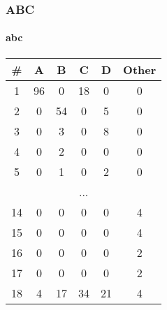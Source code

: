 \documentclass{beamer}
\begin{document}
\begin{frame}
    \frametitle{ABC}
    \framesubtitle{abc}
    
    \begin{table}
        \vspace{-0.1in}
        \centering
        \begin{tabular}{ | c | c | c | c | c | c | }
            \hline
            \# & A & B & C & D & Other \\ \hline
            1 & 96 & 0 & 18 & 0 & 0 \\ \hline
            2 & 0 & 54 & 0 & 5 & 0 \\ \hline
            3 & 0 & 3 & 0 & 8 & 0 \\ \hline
            4 & 0 & 2 & 0 & 0 & 0 \\ \hline
            5 & 0 & 1 & 0 & 2 & 0 \\ \hline
            \multicolumn{6}{c}{...} \\ \hline
            14 & 0 & 0 & 0 & 0 & 4 \\ \hline
            15 & 0 & 0 & 0 & 0 & 4 \\ \hline
            16 & 0 & 0 & 0 & 0 & 2 \\ \hline
            17 & 0 & 0 & 0 & 0 & 2 \\ \hline
            18 & 4 & 17 & 34 & 21 & 4 \\ \hline
        \end{tabular}
    \end{table}
    
\end{frame}
\end{document}
